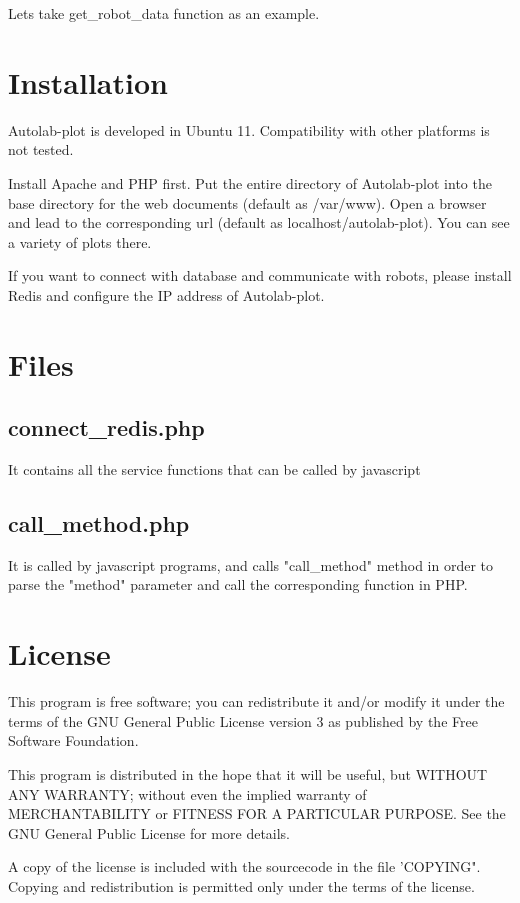 \documentclass{article}
\begin{document}
Lets take get\_robot\_data function as an example.


\section{Installation}
Autolab-plot is developed in Ubuntu 11.
Compatibility with other platforms is not tested.

Install Apache and PHP first.
Put the entire directory of Autolab-plot into the base directory for the web documents (default as /var/www).
Open a browser and lead to the corresponding url (default as localhost/autolab-plot).
You can see a variety of plots there.

If you want to connect with database and communicate with robots, please install Redis and configure the IP address of Autolab-plot.

\section{Files}
\subsection{connect\_redis.php}
It contains all the service functions that can be called by javascript

\subsection{call\_method.php}
It is called by javascript programs, and calls "call\_method" method in order to parse the "method" parameter and call the corresponding function in PHP.

\section{License}
This program is free software; you can redistribute it and/or modify it under the terms of the GNU General Public License version 3 as published by the Free Software Foundation.

This program is distributed in the hope that it will be useful, but WITHOUT ANY WARRANTY; without even the implied warranty of MERCHANTABILITY or FITNESS FOR A PARTICULAR PURPOSE. See the GNU General Public License for more details.

A copy of the license is included with the sourcecode in the file 'COPYING". Copying and redistribution is permitted only under the terms of the license.



\end{document}
